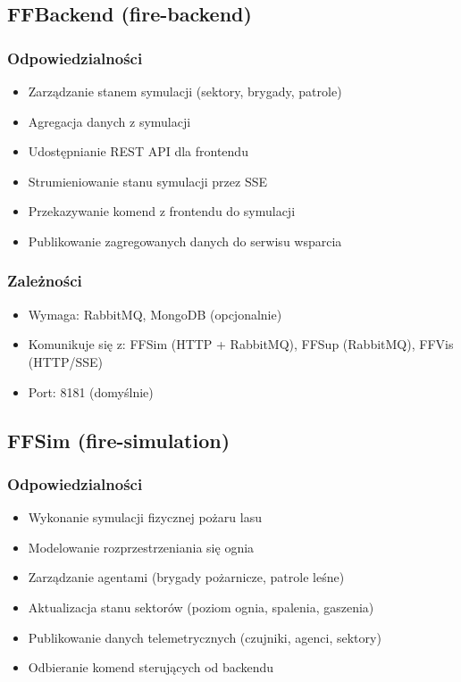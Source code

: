 \subsection{FFBackend (fire-backend)}

\subsubsection{Odpowiedzialności}

\begin{itemize}
    \item Zarządzanie stanem symulacji (sektory, brygady, patrole)
    \item Agregacja danych z symulacji
    \item Udostępnianie REST API dla frontendu
    \item Strumieniowanie stanu symulacji przez SSE
    \item Przekazywanie komend z frontendu do symulacji
    \item Publikowanie zagregowanych danych do serwisu wsparcia
\end{itemize}


\subsubsection{Zależności}

\begin{itemize}
    \item Wymaga: RabbitMQ, MongoDB (opcjonalnie)
    \item Komunikuje się z: FFSim (HTTP + RabbitMQ), FFSup (RabbitMQ), FFVis (HTTP/SSE)
    \item Port: 8181 (domyślnie)
\end{itemize}

\subsection{FFSim (fire-simulation)}

\subsubsection{Odpowiedzialności}

\begin{itemize}
    \item Wykonanie symulacji fizycznej pożaru lasu
    \item Modelowanie rozprzestrzeniania się ognia
    \item Zarządzanie agentami (brygady pożarnicze, patrole leśne)
    \item Aktualizacja stanu sektorów (poziom ognia, spalenia, gaszenia)
    \item Publikowanie danych telemetrycznych (czujniki, agenci, sektory)
    \item Odbieranie komend sterujących od backendu
\end{itemize}


